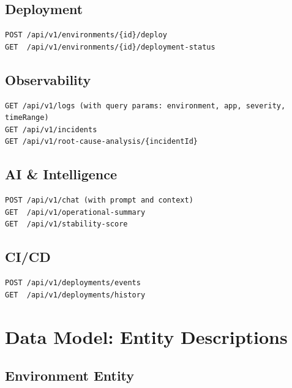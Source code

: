 \documentclass[12pt,a4paper]{report}
\begin{document}
\section{Deployment}

\begin{verbatim}
POST /api/v1/environments/{id}/deploy
GET  /api/v1/environments/{id}/deployment-status
\end{verbatim}

\section{Observability}

\begin{verbatim}
GET /api/v1/logs (with query params: environment, app, severity, timeRange)
GET /api/v1/incidents
GET /api/v1/root-cause-analysis/{incidentId}
\end{verbatim}

\section{AI \& Intelligence}

\begin{verbatim}
POST /api/v1/chat (with prompt and context)
GET  /api/v1/operational-summary
GET  /api/v1/stability-score
\end{verbatim}

\section{CI/CD}

\begin{verbatim}
POST /api/v1/deployments/events
GET  /api/v1/deployments/history
\end{verbatim}

\chapter{Data Model: Entity Descriptions}

\section{Environment Entity}
\end{document}
